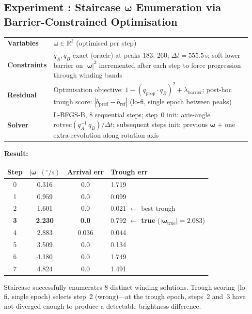 \documentclass[11pt,a4paper]{article}
\makeatletter
\newcounter{expnum}
\newenvironment{experiment}[1]{%
  \refstepcounter{expnum}%
  \subsection*{Experiment \theexpnum: #1}%
  \vspace{-0.5em}%
}{\vspace{1em}}
\newcommand{\setup}[4]{%
  \noindent
  \begin{tabular}{@{}p{2.8cm}p{11cm}@{}}
    \toprule
    \textbf{Variables}    & #1 \\
    \textbf{Constraints}  & #2 \\
    \textbf{Residual}     & #3 \\
    \textbf{Solver}       & #4 \\
    \bottomrule
  \end{tabular}
  \vspace{0.8em}
}
\makeatother
\begin{document}
\begin{experiment}{Staircase $\boldsymbol{\omega}$ Enumeration via Barrier-Constrained Optimisation}

\setup
  {$\boldsymbol{\omega} \in \mathbb{R}^3$ (optimised per step)}
  {$q_A, q_B$ exact (oracle) at peaks 183, 260; $\Delta t = 555.5\,$s; soft lower barrier on $|\boldsymbol{\omega}|^2$ incremented after each step to force progression through winding bands}
  {Optimisation objective: $1 - (q_\text{prop} \cdot q_B)^2 + \lambda_\text{barrier}$;\; post-hoc trough score: $|b_\text{pred} - b_\text{ref}|$ (lo-fi, single epoch between peaks)}
  {L-BFGS-B, 8 sequential steps; step~0 init: axis-angle $\mathrm{rotvec}(q_A^{-1}\,q_B)/\Delta t$; subsequent steps init: previous $\boldsymbol{\omega}$ + one extra revolution along rotation axis}

\textbf{Result:}

\begin{center}
\begin{tabular}{cccl}
  \toprule
  Step & $|\boldsymbol{\omega}|\;(^\circ/\text{s})$ & Arrival err & Trough err \\
  \midrule
  0 & 0.316 & 0.0 & 1.719 \\
  1 & 0.959 & 0.0 & 0.099 \\
  2 & 1.601 & 0.0 & 0.021 $\leftarrow$ best trough \\
  \textbf{3} & \textbf{2.230} & \textbf{0.0} & 0.792 $\leftarrow$ \textbf{true} ($|\boldsymbol{\omega}_\text{true}| = 2.083$) \\
  4 & 2.883 & 0.036 & 0.044 \\
  5 & 3.509 & 0.0 & 0.134 \\
  6 & 4.180 & 0.0 & 1.749 \\
  7 & 4.824 & 0.0 & 1.491 \\
  \bottomrule
\end{tabular}
\end{center}

Staircase successfully enumerates 8 distinct winding solutions. Trough scoring (lo-fi, single epoch) selects step~2 (wrong)---at the trough epoch, steps~2 and~3 have not diverged enough to produce a detectable brightness difference.

\end{experiment}
\end{document}

